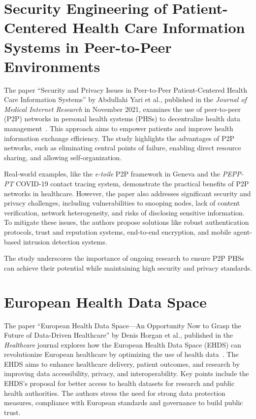 \section{Security Engineering of Patient-Centered Health Care Information Systems in Peer-to-Peer Environments}\label{sec:security-engineering-of-patient-centered-health-care-information-systems-in-peer-to-peer-environments}

The paper ``Security and Privacy Issues in Peer-to-Peer Patient-Centered Health Care Information Systems'' by Abdullahi Yari et al., published in the \textit{Journal of Medical Internet Research} in November 2021, examines the use of peer-to-peer (P2P) networks in personal health systems (PHSs) to decentralize health data management~\cite{security_engineering_p2p_environments}.
This approach aims to empower patients and improve health information exchange efficiency.
The study highlights the advantages of P2P networks, such as eliminating central points of failure, enabling direct resource sharing, and allowing self-organization.

Real-world examples, like the \textit{e-toile} P2P framework in Geneva and the \textit{PEPP-PT} COVID-19 contact tracing system, demonstrate the practical benefits of P2P networks in healthcare.
However, the paper also addresses significant security and privacy challenges, including vulnerabilities to snooping nodes, lack of content verification, network heterogeneity, and risks of disclosing sensitive information.
To mitigate these issues, the authors propose solutions like robust authentication protocols, trust and reputation systems, end-to-end encryption, and mobile agent-based intrusion detection systems.%

The study underscores the importance of ongoing research to ensure P2P PHSs can achieve their potential while maintaining high security and privacy standards.

\section{European Health Data Space}\label{sec:european-health-data-spac}

The paper ``European Health Data Space—An Opportunity Now to Grasp the Future of Data-Driven Healthcare'' by Denis Horgan et al., published in the \textit{Healthcare} journal explores how the European Health Data Space (EHDS) can revolutionize European healthcare by optimizing the use of health data~\cite{european_health_data_space}.
The EHDS aims to enhance healthcare delivery, patient outcomes, and research by improving data accessibility, privacy, and interoperability.
Key points include the EHDS's proposal for better access to health datasets for research and public health authorities.
The authors stress the need for strong data protection measures, compliance with European standards and governance to build public trust.

